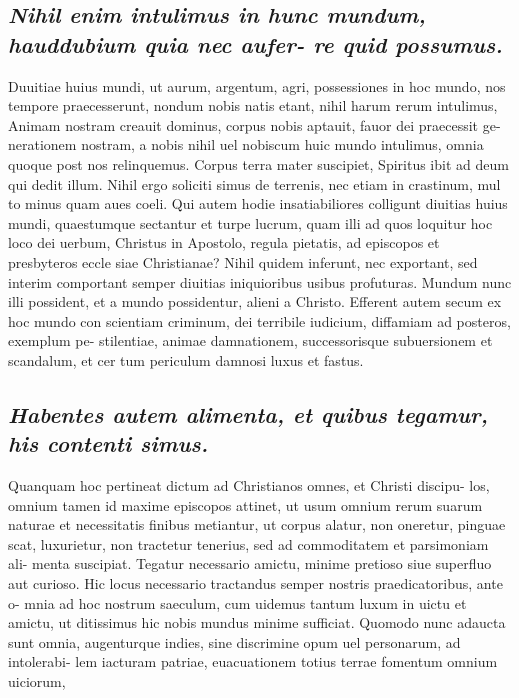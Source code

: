 \documentclass{article}
\begin{document}
\begin{pages}
\subsection*{\textit{Nihil enim intulimus in hunc mundum, hauddubium quia nec aufer- re quid possumus. }}\pstart Duuitiae huius mundi, ut aurum, argentum, agri, possessiones in hoc mundo, nos tempore praecesserunt, nondum nobis natis etant, nihil harum rerum intulimus, Animam nostram creauit dominus, corpus nobis aptauit, fauor dei praecessit ge- nerationem nostram, a nobis nihil uel nobiscum huic mundo intulimus, omnia quoque post nos relinquemus. Corpus terra mater suscipiet, Spiritus ibit ad deum qui dedit illum. Nihil ergo soliciti simus de terrenis, nec etiam in crastinum, mul to minus quam aues coeli. Qui autem hodie insatiabiliores colligunt diuitias huius mundi, quaestumque sectantur et turpe lucrum, quam illi ad quos loquitur hoc loco dei uerbum, Christus in Apostolo, regula pietatis, ad episcopos et presbyteros eccle siae Christianae? Nihil quidem inferunt, nec exportant, sed interim comportant semper diuitias iniquioribus usibus profuturas. Mundum nunc illi possident, et a mundo possidentur, alieni a Christo. Efferent autem secum ex hoc mundo con scientiam criminum, dei terribile iudicium, diffamiam ad posteros, exemplum pe- stilentiae, animae damnationem, successorisque subuersionem et scandalum, et cer tum periculum damnosi luxus et fastus.  \pend
{}
{}
\subsection*{\textit{Habentes autem alimenta, et quibus tegamur, his contenti simus. }}\pstart Quanquam hoc pertineat dictum ad Christianos omnes, et Christi discipu- los, omnium tamen id maxime episcopos attinet, ut usum omnium rerum suarum naturae et necessitatis finibus metiantur, ut corpus alatur, non oneretur, pinguae scat, luxurietur, non tractetur tenerius, sed ad commoditatem et parsimoniam ali- menta suscipiat. Tegatur necessario amictu, minime pretioso siue superfluo aut curioso. Hic locus necessario tractandus semper nostris praedicatoribus, ante o- mnia ad hoc nostrum saeculum, cum uidemus tantum luxum in uictu et amictu, ut ditissimus hic nobis mundus minime sufficiat. Quomodo nunc adaucta sunt omnia, augenturque indies, sine discrimine opum uel personarum, ad intolerabi- lem iacturam patriae, euacuationem totius terrae fomentum omnium uiciorum,  \pend

\end{pages}
\end{document}
